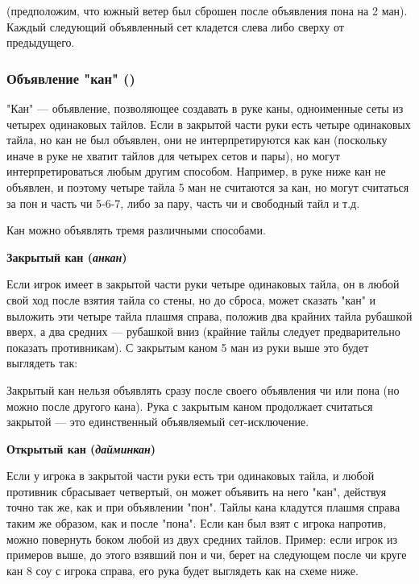  \hfill {}

(предположим, что южный ветер был сброшен после объявления пона на 2 ман). Каждый следующий объявленный сет кладется слева либо сверху от предыдущего.

\subsubsection{Объявление "кан" ()}

"Кан" --- объявление, позволяющее создавать в руке каны, одноименные сеты из четырех одинаковых тайлов. Если в закрытой части руки есть четыре одинаковых тайла, но кан не был объявлен, они не интерпретируются как кан (поскольку иначе в руке не хватит тайлов для четырех сетов и пары), но могут интерпретироваться любым другим способом. Например, в руке ниже кан не объявлен, и поэтому четыре тайла 5 ман не считаются за кан, но могут считаться за пон и часть чи 5-6-7, либо за пару, часть чи и свободный тайл и т.д.


Кан можно объявлять тремя различными способами.

\textbf{Закрытый кан (\textit{анкан})}

Если игрок имеет в закрытой части руки четыре одинаковых тайла, он в любой свой ход после взятия тайла со стены, но до сброса, может сказать "кан" и выложить эти четыре тайла плашмя справа, положив два крайних тайла рубашкой вверх, а два средних --- рубашкой вниз (крайние тайлы следует предварительно показать противникам). С закрытым каном 5 ман из руки выше это будет выглядеть так:

 \hfill {}

Закрытый кан нельзя объявлять сразу после своего объявления чи или пона (но можно после другого кана). Рука с закрытым каном продолжает считаться закрытой --- это единственный объявляемый сет-исключение.

\textbf{Открытый кан (\textit{дайминкан})}

Если у игрока в закрытой части руки есть три одинаковых тайла, и любой противник сбрасывает четвертый, он может объявить на него "кан", действуя точно так же, как и при объявлении "пон". Тайлы кана кладутся плашмя справа таким же образом, как и после "пона". Если кан был взят с игрока напротив, можно повернуть боком любой из двух средних тайлов. Пример: если игрок из примеров выше, до этого взявший пон и чи, берет на следующем после чи круге кан 8 соу с игрока справа, его рука будет выглядеть как на схеме ниже.

